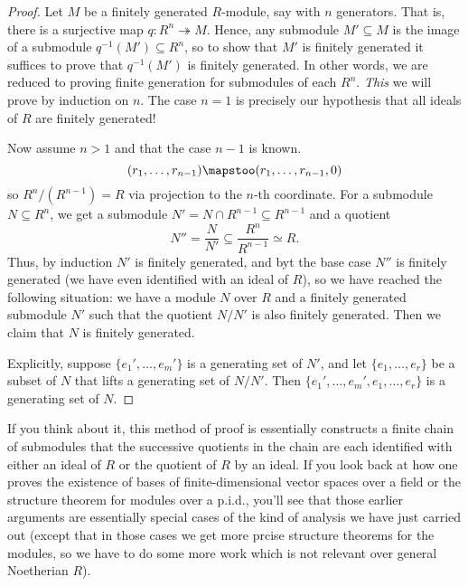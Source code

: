 \begin{proof}
  Let \(M\) be a finitely generated \(R\)-module, say with \(n\)
  generators. That is, there is a surjective map \(q\colon
  R^n\twoheadrightarrow M\). Hence, any submodule \(M'\subseteq M\) is the
  image of a submodule \(q^{-1}(M')\subseteq R^n\), so to show that \(M'\)
  is finitely generated it suffices to prove that \(q^{-1}(M')\) is
  finitely generated. In other words, we are reduced to proving finite
  generation for submodules of each \(R^n\). \emph{This} we will prove by
  induction on \(n\). The case \(n=1\) is precisely our hypothesis that all
  ideals of \(R\) are finitely generated!

  Now assume \(n>1\) and that the case \(n-1\) is known.
  \[
    (r_1,\dotsc,r_{n-1})\mapstoo (r_1,\dotsc,r_{n-1},0)
  \]
  so \(R^n/(R^{n-1})=R\) via projection to the \(n\)-th coordinate. For a
  submodule \(N\subseteq R^n\), we get a submodule \(N'=N\cap
  R^{n-1}\subseteq R^{n-1}\) and a quotient
  \[
    N''=\frac{N}{N'}\subseteq\frac{R^n}{R^{n-1}}\simeq R.
  \]
  Thus, by induction \(N'\) is finitely generated, and byt the base case
  \(N''\) is finitely generated (we have even identified with an ideal of
  \(R\)), so we have reached the following situation: we have a module
  \(N\) over \(R\) and a finitely generated submodule \(N'\) such that the
  quotient \(N/N'\) is also finitely generated. Then we claim that \(N\) is
  finitely generated.

  Explicitly, suppose \(\{e_1',\dotsc,e_m'\}\) is a generating set of
  \(N'\), and let \(\{e_1,\dotsc,e_r\}\) be a subset of \(N\) that lifts a
  generating set of \(N/N'\). Then \(\{e_1',\dotsc,e_m',e_1,\dotsc,e_r\}\)
  is a generating set of \(N\).
\end{proof}

If you think about it, this method of proof is essentially constructs a
finite chain of submodules that the successive quotients in the chain are
each identified with either an ideal of \(R\) or the quotient of \(R\) by
an ideal. If you look back at how one proves the existence of bases of
finite-dimensional vector spaces over a field or the structure theorem for
modules over a p.i.d., you'll see that those earlier arguments are
essentially special cases of the kind of analysis we have just carried out
(except  that in those cases we get more prcise structure theorems for the
modules, so we have to do some more work which is not relevant over general
Noetherian \(R\)).


